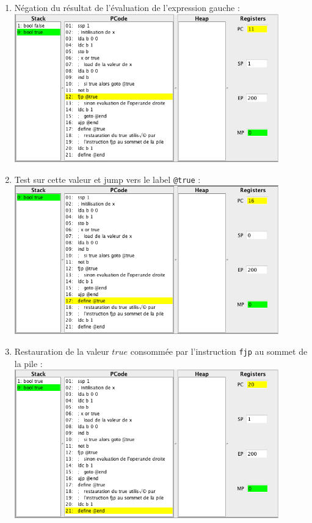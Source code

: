 \documentclass[french,11pt,twoside]{article}
\begin{document}
\begin{enumerate}
\item Négation du résultat de l'évaluation de l'expression gauche :\\
            \includegraphics[width=0.9\textwidth]{images/exemple2-step3} 
\item Test sur cette valeur et jump vers le label \texttt{@true} :\\
            \includegraphics[width=0.9\textwidth]{images/exemple2-step4} 
\item Restauration de la valeur $true$ consommée par l'instruction \texttt{fjp} au sommet de la pile :\\
            \includegraphics[width=0.9\textwidth]{images/exemple2-step5} 
\end{enumerate}
\end{document}
